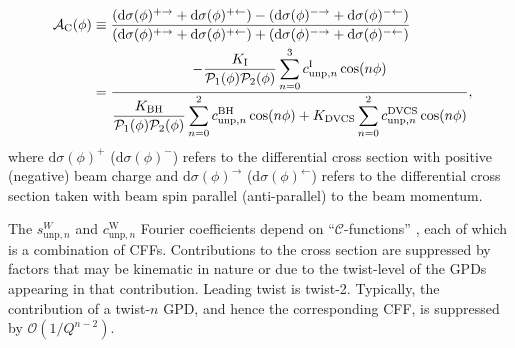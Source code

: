 \begin{align}
\hspace{0.5cm}\mathcal{A}_{\textrm{C}}(\phi) &\equiv  
\frac{(\textrm{d}\sigma(\phi)^{+\rightarrow} +
\textrm{d}\sigma(\phi)^{+\leftarrow}) -
(\textrm{d}\sigma(\phi)^{-\rightarrow}
+ \textrm{d}\sigma(\phi)^{-\leftarrow})}{(\textrm{d}\sigma(\phi)^{+\rightarrow}
+
\textrm{d}\sigma(\phi)^{+\leftarrow}) +
(\textrm{d}\sigma(\phi)^{-\rightarrow}
+ \textrm{d}\sigma(\phi)^{-\leftarrow})}&    \nonumber \\
&=\dfrac{{-\dfrac{K_{\textrm{I}}}{\mathcal{P}_{1}(\phi)\mathcal{P}_{2}(\phi)}
\displaystyle\sum_{n=0}^3
c_{\textrm{unp},n}^{\textrm{I}}\cos(n\phi)}}{\dfrac{K_{\textrm{BH}}}{\mathcal{P}_{1}
(\phi)\mathcal{P}_
{2}(\phi)}
\displaystyle\sum_{n=0}^2
c_{\textrm{unp},n}^{\textrm{BH}}\cos(n\phi) + 
K_{\textrm{DVCS}}\displaystyle\sum_{n=0}^2 c_{\textrm{unp},n}^{\textrm{DVCS}}\cos(n\phi)} ,&
\label{e:ac}
\end{align}
where $\textrm{d}\sigma(\phi)^+$ ($\textrm{d}\sigma(\phi)^-$) refers to
the differential cross section with positive (negative) beam charge and
$\textrm{d}\sigma(\phi)^\rightarrow$ ($\textrm{d}\sigma(\phi)^\leftarrow$) refers
to the differential cross section taken with beam spin parallel (anti-parallel) to the
beam momentum.

The $s_{\textrm{unp},n}^{W}$ and $c_{\textrm{unp},n}^{\textrm{W}}$ Fourier
coefficients depend on ``$\mathcal{C}$-functions'' \cite{Bel02b}, each of which is a
combination of CFFs. Contributions to the cross section are suppressed by factors that may be kinematic in nature or due to the twist-level of the GPDs appearing in that contribution. Leading twist is twist-2. Typically, the contribution of a twist-$n$ GPD, and hence the corresponding CFF, is
suppressed by $\mathcal{O}(1/Q^{n-2})$. 

